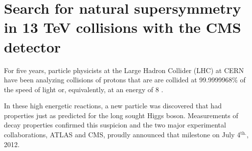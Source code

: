 \documentclass[11pt,a4paper]{article}
\begin{document}
\def\gluino{\mbox{$\tilde g$}\xspace}
\def\mgluino{\mbox{$m_{\tilde g}$}\xspace}
\def\mStop{\mbox{$m_{\tilde t}$}\xspace}
\def\mSbottom{\mbox{$m_{\tilde b}$}\xspace}
\def\mCha{\mbox{$m_{\tilde{\chi}^{\pm}_1}$}\xspace}
\def\mNeu{\mbox{$m_{\tilde{\chi}^{0}_1}$}\xspace}
\def\nbtags{\mbox{$n_{\cPqb\textrm{-tag}}$}\xspace}
\def\njets{\mbox{$n_{\textrm{jets}}$}\xspace}
\def\mT{\mbox{$m_{\textrm{T}}$}\xspace}
\newcommand{\jptratio}[2]{\mbox{$p_{\textrm{T\,\vline\,#1,#2}}^{\textrm{ratio}}$}\xspace}
\newcommand{\ptb}[1]{\mbox{$p_{\textrm{T}}^{}(b_#1)$}\xspace}
\def\mTW{\mbox{$m_{\textrm{T}2}^W$}\xspace}
\def\HT{\mbox{$H_{\textrm{T}}$}\xspace}
\def\HTratio{\mbox{$H_{\textrm{T}}^{\textrm{ratio}}$}\xspace}
\def\dphi{\mbox{$\Delta\phi(W,l)$}\xspace}
\def\dphimet{\mbox{$\Delta\phi(\ETmiss,j_{1,2})$}\xspace}
\def\ttjets{\mbox{\ensuremath{\cmsSymbolFace{t}\overline{\cmsSymbolFace{t}}}+jets}\xspace}
\def\wjets{\mbox{\ensuremath{W}+jets}\xspace}
\newcommand{\fixme}[1]{\textcolor{red}{FIXME: #1}} %
\newcommand{\tobechecked}[1]{\textcolor{red}{#1}\marginpar{\textcolor{red}{\textbf{X}}}}
\newcommand{\boldStart}[1]{\noindent{\bf{#1}}}
\onehalfspacing
\addtolength{\leftmargin}{-2in}
\thispagestyle{empty}

\section*{Search for natural supersymmetry in 13 TeV collisions with the CMS detector}

For five years, particle physicists at the Large Hadron Collider (LHC) at CERN have been analyzing collisions of protons 
that are are collided at 99.9999968\% of the speed of light or, equivalently, at an energy of 8 \TeV.

In these high energetic reactions, a new particle was discovered that had properties just as predicted for the long sought Higgs boson. 
Measurements of decay properties confirmed this suspicion and the two major experimental collaborations, ATLAS and CMS, proudly announced that milestone on July 4${}^{\textrm{th.}}$, 2012.
\end{document}
